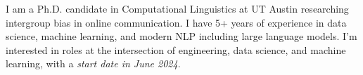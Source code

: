 I am a Ph.D. candidate in Computational Linguistics at UT Austin researching intergroup bias in online communication. I have 5+ years of experience in data science, machine learning, and modern NLP including large language models. I'm interested in roles at the intersection of engineering, data science, and machine learning, with a \emph{start date in June 2024}.

